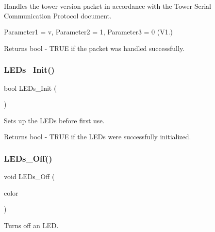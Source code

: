 Handles the tower version packet in accordance with the Tower Serial Communication Protocol document. 

Parameter1 = \textquotesingle{}v\textquotesingle{}, Parameter2 = 1, Parameter3 = 0 (V1.) \begin{DoxyReturn}{Returns}
bool -\/ T\+R\+UE if the packet was handled successfully. 
\end{DoxyReturn}
\mbox{\label{group__main__module_gaea5d2a9d1aacacc05e4d772a555b2d9d}} 
\subsubsection{\texorpdfstring{L\+E\+Ds\+\_\+\+Init()}{LEDs\_Init()}}
{\footnotesize\ttfamily bool L\+E\+Ds\+\_\+\+Init (\begin{DoxyParamCaption}\item[{void}]{ }\end{DoxyParamCaption})}



Sets up the L\+E\+Ds before first use. 

\begin{DoxyReturn}{Returns}
bool -\/ T\+R\+UE if the L\+E\+Ds were successfully initialized. 
\end{DoxyReturn}
\mbox{\label{group__main__module_gaefecb26a8d3457bc7f7a7b2fb8b7311f}} 
\subsubsection{\texorpdfstring{L\+E\+Ds\+\_\+\+Off()}{LEDs\_Off()}}
{\footnotesize\ttfamily void L\+E\+Ds\+\_\+\+Off (\begin{DoxyParamCaption}\item[{const \hyperlink{_l_e_ds_8h_a833ecccaa4c55e8365e84d6c02f92ec1}{T\+L\+ED}}]{color }\end{DoxyParamCaption})}



Turns off an L\+ED. 


